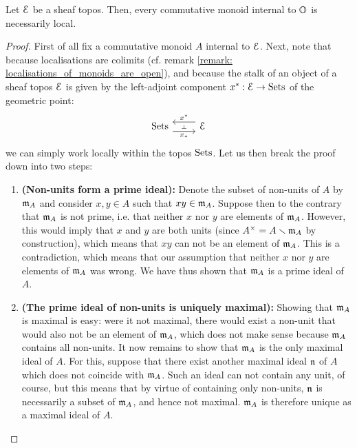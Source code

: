            \begin{lemma} \label{lemma: monoids_in_topoi_are_local}
                Let $\mathcal{E}$ be a sheaf topos. Then, every commutative monoid internal to $\mathbb{O}$ is necessarily local.
            \end{lemma}
                \begin{proof}
                First of all fix a commutative monoid $A$ internal to $\mathcal{E}$. Next, note that because localisations are colimits (cf. remark \ref{remark: localisations_of_monoids_are_open}), and because the stalk of an object of a sheaf topos $\mathcal{E}$ is given by the left-adjoint component $x^*: \mathcal{E} \to \mathrm{Sets}$ of the geometric point:
                    $$
                        \begin{tikzcd}
                        	\Sets & \E
                        	\arrow[""{name=0, anchor=center, inner sep=0}, "{x_*}"', shift right=2, from=1-1, to=1-2]
                        	\arrow[""{name=1, anchor=center, inner sep=0}, "{x^*}"', shift right=2, from=1-2, to=1-1]
                        	\arrow["\dashv"{anchor=center, rotate=-90}, draw=none, from=1, to=0]
                        \end{tikzcd}
                    $$
                we can simply work locally within the topos $\mathrm{Sets}$. Let us then break the proof down into two steps:
                    \begin{enumerate}
                        \item \textbf{(Non-units form a prime ideal):} Denote the subset of non-units of $A$ by $\mathfrak{m}_A$ and consider $x, y \in A$ such that $xy \in \mathfrak{m}_A$. Suppose then to the contrary that $\mathfrak{m}_A$ is not prime, i.e. that neither $x$ nor $y$ are elements of $\mathfrak{m}_A$. However, this would imply that $x$ and $y$ are both units (since $A^{\x} = A \setminus \m_A$ by construction), which means that $xy$ can not be an element of $\mathfrak{m}_A$. This is a contradiction, which means that our assumption that neither $x$ nor $y$ are elements of $\mathfrak{m}_A$ was wrong. We have thus shown that $\mathfrak{m}_A$ is a prime ideal of $A$.  
                        \item \textbf{(The prime ideal of non-units is uniquely maximal):} Showing that $\mathfrak{m}_A$ is maximal is easy: were it not maximal, there would exist a non-unit that would also not be an element of $\mathfrak{m}_A$, which does not make sense because $\mathfrak{m}_A$ contains all non-units. It now remains to show that $\mathfrak{m}_A$ is the only maximal ideal of $A$. For this, suppose that there exist another maximal ideal $\mathfrak{n}$ of $A$ which does not coincide with $\mathfrak{m}_A$. Such an ideal can not contain any unit, of course, but this means that by virtue of containing only non-units, $\mathfrak{n}$ is necessarily a subset of $\mathfrak{m}_A$, and hence not maximal. $\mathfrak{m}_A$ is therefore unique as a maximal ideal of $A$. 
                    \end{enumerate}
                \end{proof}
